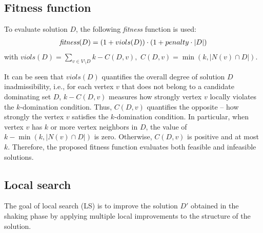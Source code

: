 \documentclass[dvipsnames,format=sigconf]{acmart} %
\begin{document}
\subsection{Fitness function}\label{subsec:fit}
   To evaluate solution $D$, the following   \emph{fitness} function is used:
   \begin{align}\label{eq:fitness}
      \emph{fitness}(D) = ( 1 + viols(D)) \cdot ( 1+ penalty \cdot |D|)
   \end{align}
   with   $viols(D) = \sum_{v \in V \setminus D}{k-C(D, v)},$  $C(D, v) = \min(k, |N(v) \cap D|)$.
   

It can be seen that $viols(D)$ quantifies the overall degree of solution $D$ inadmissibility, i.e., for each vertex $v$ that does not belong to a candidate dominating set $D$, $k-C(D, v)$ measures how strongly vertex $v$ locally violates the $k$-domination condition. Thus, $C(D, v)$ quantifies the opposite -- how strongly the vertex $v$ satisfies the $k$-domination condition. In particular, when vertex $v$ has $k$ or more vertex neighbors in $D$, the value of $k - \min(k, |N(v) \cap D|)$ is zero. Otherwise, $C(D, v)$ is positive and at most $k$. Therefore, the proposed fitness function evaluates both feasible and infeasible solutions. 
\begin{comment}Since the fitness function is to be minimized, the following three observations can be made about the values of the fitness function:
\begin{itemize}
 		\item For sufficiently small values of the parameter \emph{penalty}, the feasibility of the solution is relatively preferred over the cardinality of the solution. This means that when comparing feasible and infeasible solutions, the feasible solution is favored. 
 
     	\item When comparing two infeasible solutions of the same cardinality, the \emph{less infeasible} solution is preferred, i.e. the one with the lower $viols(\cdot)$ value.  
        
        \item When comparing two feasible solutions, the one with the lower cardinality is preferred.
\end{itemize}\end{comment}

\subsection{Local search}\label{sec:local_search}
The goal of local search (LS) is to improve the solution $D'$ obtained in the shaking phase by applying multiple local improvements to the structure of the solution. 
\end{document}
